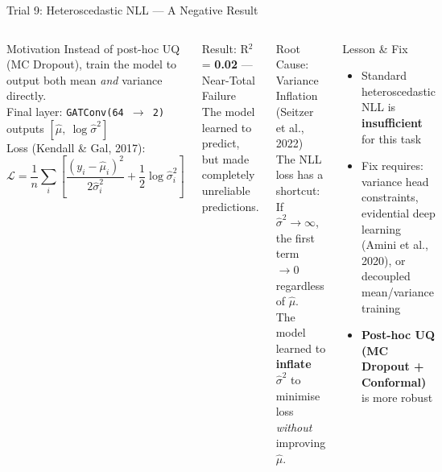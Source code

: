 \documentclass[aspectratio=169,10pt]{beamer}
\newcommand{\emphblue}[1]{\textcolor{tumblue}{\textbf{#1}}}
\newcommand{\emphred}[1]{\textcolor{tumred}{\textbf{#1}}}
\begin{document}
\begin{frame}{Trial 9: Heteroscedastic NLL — A Negative Result}
  \begin{columns}[c]
      \begin{block}{Motivation}
        Instead of post-hoc UQ (MC Dropout), train the model to output both mean \emph{and} variance directly.\\[0.3em]
        Final layer: \texttt{GATConv(64 $\to$ 2)} outputs $[\hat{\mu},\ \log\hat{\sigma}^2]$\\[0.3em]
        Loss (Kendall \& Gal, 2017):
        \[
          \mathcal{L} = \frac{1}{n}\sum_i \left[\frac{(y_i - \hat{\mu}_i)^2}{2\hat{\sigma}_i^2} + \frac{1}{2}\log\hat{\sigma}_i^2\right]
        \]
      \end{block}
      \vspace{0.3em}
      \begin{alertblock}{Result: R$^2$ = \emphred{0.02} — Near-Total Failure}
        The model learned to predict, but made completely unreliable predictions.
      \end{alertblock}
      \begin{alertblock}{Root Cause: Variance Inflation (Seitzer et al., 2022)}
        The NLL loss has a shortcut:\\[0.3em]
        If $\hat{\sigma}^2 \to \infty$, the first term $\to 0$ regardless of $\hat{\mu}$.\\[0.3em]
        The model learned to \emphred{inflate $\hat{\sigma}^2$} to minimise loss \emph{without} improving $\hat{\mu}$.
      \end{alertblock}
      \vspace{0.4em}
      \begin{exampleblock}{Lesson \& Fix}
        \begin{itemize}
          \item Standard heteroscedastic NLL is \emphred{insufficient} for this task
          \item Fix requires: variance head constraints, evidential deep learning (Amini et al., 2020), or decoupled mean/variance training
          \item \emphblue{Post-hoc UQ (MC Dropout + Conformal)} is more robust
        \end{itemize}
      \end{exampleblock}
  \end{columns}
\end{frame}
\end{document}
